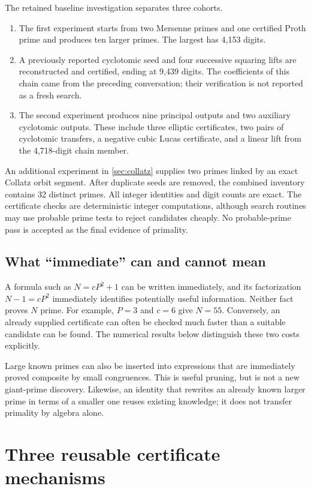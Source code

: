\documentclass[11pt,a4paper]{article}
\theoremstyle{definition}\newtheorem{definition}[theorem]{Definition}
\theoremstyle{remark}\newtheorem{remark}[theorem]{Remark}
\begin{document}
The retained baseline investigation separates three cohorts.
\begin{enumerate}[label=\textup{(\roman*)}]
\item The first experiment starts from two Mersenne primes and one certified
Proth prime and produces ten larger primes. The largest has 4,153 digits.
\item A previously reported cyclotomic seed and four successive squaring
lifts are reconstructed and certified, ending at 9,439 digits. The coefficients
of this chain came from the preceding conversation; their verification is not
reported as a fresh search.
\item The second experiment produces nine principal outputs and two auxiliary
cyclotomic outputs. These include three elliptic certificates, two pairs of
cyclotomic transfers, a negative cubic Lucas certificate, and a linear lift
from the 4,718-digit chain member.
\end{enumerate}
An additional experiment in \cref{sec:collatz} supplies two primes linked by
an exact Collatz orbit segment. After duplicate seeds are removed, the combined
inventory contains 32 distinct primes.
All integer identities and digit counts are exact. The certificate checks are
deterministic integer computations, although search routines may use probable
prime tests to reject candidates cheaply. No probable-prime pass is accepted
as the final evidence of primality.

\subsection{What ``immediate'' can and cannot mean}

A formula such as $N=cP^2+1$ can be written immediately, and its factorization
$N-1=cP^2$ immediately identifies potentially useful information. Neither fact
proves $N$ prime. For example, $P=3$ and $c=6$ give $N=55$. Conversely, an
already supplied certificate can often be checked much faster than a suitable
candidate can be found. The numerical results below distinguish these two
costs explicitly.

Large known primes can also be inserted into expressions that are immediately
proved composite by small congruences. This is useful pruning, but is not a
new giant-prime discovery. Likewise, an identity that rewrites an already known
larger prime in terms of a smaller one reuses existing knowledge; it does not
transfer primality by algebra alone.

\section{Three reusable certificate mechanisms}
\label{sec:mechanisms}
\end{document}
